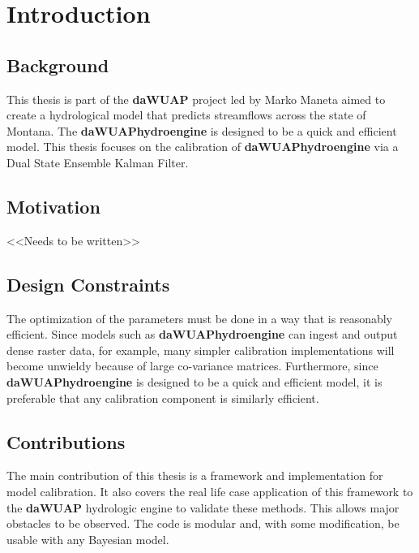 \chapter{Introduction}

\section{Background}

This thesis is part of the \textbf{daWUAP} project led by Marko Maneta aimed to create a hydrological model that predicts streamflows across the state of Montana. The \textbf{daWUAPhydroengine} is designed to be a quick and efficient model. This thesis focuses on the calibration of \textbf{daWUAPhydroengine} via a Dual State Ensemble Kalman Filter.

\section{Motivation}
\label{ch1:opts}

<<Needs to be written>>

\section{Design Constraints}

The optimization of the parameters must be done in a way that is reasonably efficient. Since models such as \textbf{daWUAPhydroengine} can ingest and output dense raster data, for example, many simpler calibration implementations will become unwieldy because of large co-variance matrices. Furthermore, since \textbf{daWUAPhydroengine} is designed to be a quick and efficient model, it is preferable that any calibration component is similarly efficient.


\section{Contributions}

The main contribution of this thesis is a framework and implementation for model calibration. It also covers the real life case application of this framework to the \textbf{daWUAP} hydrologic engine to validate these methods. This allows major obstacles to be observed. The code is modular and, with some modification, be usable with any Bayesian model.

